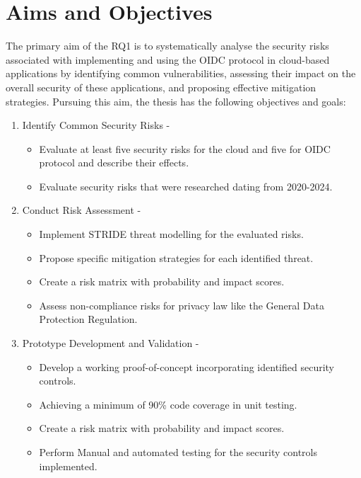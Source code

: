 \section{Aims and Objectives}
The primary aim of the RQ1 is to systematically analyse the security risks associated with implementing and using the OIDC protocol in cloud-based applications by identifying common vulnerabilities, assessing their impact on the overall security of these applications, and proposing effective mitigation strategies. Pursuing this aim, the thesis has the following objectives and goals:

\begin{enumerate}
  \item Identify Common Security Risks - 
  \begin{itemize}
      \item Evaluate at least five security risks for the cloud and five for OIDC protocol and describe their effects.
      \item Evaluate security risks that were researched dating from 2020-2024.
  \end{itemize}

    
  \item Conduct Risk Assessment  - 
  \begin{itemize}
      \item Implement STRIDE threat modelling for the evaluated risks.
      \item Propose specific mitigation strategies for each identified threat.
      \item Create a risk matrix with probability and impact scores.
      \item Assess non-compliance risks for privacy law like the General Data Protection Regulation. 
  \end{itemize}
  \item Prototype Development and Validation - 
  \begin{itemize}
      \item Develop a working proof-of-concept incorporating identified security controls.
      \item Achieving a minimum of 90\% code coverage in unit testing.
      \item Create a risk matrix with probability and impact scores.
      \item Perform Manual and automated testing for the security controls implemented.
  \end{itemize}
\end{enumerate}

